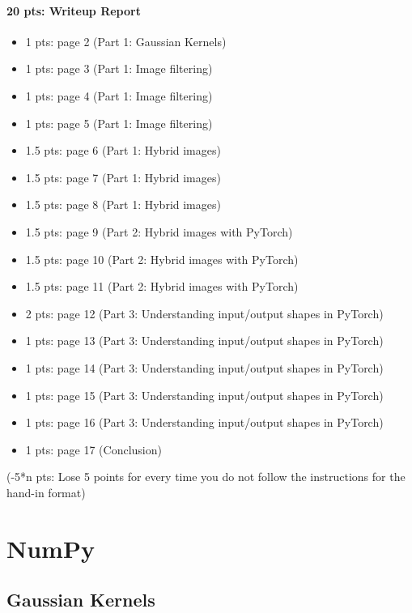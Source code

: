 \documentclass{article}
\begin{document}
\paragraph{20 pts: Writeup Report}
\begin{itemize}
    \setlength\itemsep{-0.3em}
    \item 1 pts: page 2 (Part 1: Gaussian Kernels)
    \item 1 pts: page 3 (Part 1: Image filtering)
    \item 1 pts: page 4 (Part 1: Image filtering)
    \item 1 pts: page 5 (Part 1: Image filtering)
    \item 1.5 pts: page 6 (Part 1: Hybrid images)
    \item 1.5 pts: page 7 (Part 1: Hybrid images)
    \item 1.5 pts: page 8 (Part 1: Hybrid images)
    \item 1.5 pts: page 9 (Part 2: Hybrid images with PyTorch)
    \item 1.5 pts: page 10 (Part 2: Hybrid images with PyTorch)
    \item 1.5 pts: page 11 (Part 2: Hybrid images with PyTorch)
    \item 2 pts: page 12 (Part 3: Understanding input/output shapes in PyTorch)
    \item 1 pts: page 13 (Part 3: Understanding input/output shapes in PyTorch)
    \item 1 pts: page 14 (Part 3: Understanding input/output shapes in PyTorch)
    \item 1 pts: page 15 (Part 3: Understanding input/output shapes in PyTorch)
    \item 1 pts: page 16 (Part 3: Understanding input/output shapes in PyTorch)
    \item 1 pts: page 17 (Conclusion)
\end{itemize}
(-5*n pts: Lose 5 points for every time you do not follow the instructions for the hand-in format)


\section{NumPy}

\subsection{Gaussian Kernels}
\end{document}
